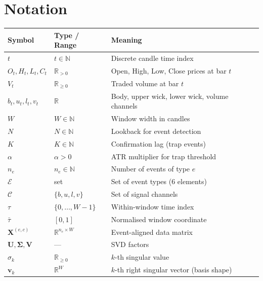 \documentclass[11pt,a4paper]{article}
\theoremstyle{definition}
\theoremstyle{plain}
\newcommand{\R}{\mathbb{R}}
\newcommand{\N}{\mathbb{N}}
\newcommand{\Xmat}{\mathbf{X}}
\newcommand{\Umat}{\mathbf{U}}
\newcommand{\Smat}{\boldsymbol{\Sigma}}
\newcommand{\Vmat}{\mathbf{V}}
\newcommand{\bvec}[1]{\mathbf{#1}}
\begin{document}
\section{Notation}
\label{sec:notation}

\begin{center}
\small
\begin{tabular}{lll}
\hline
\textbf{Symbol} & \textbf{Type / Range} & \textbf{Meaning} \\
\hline
$t$               & $t \in \N$                    & Discrete candle time index \\
$O_t, H_t, L_t, C_t$ & $\R_{>0}$              & Open, High, Low, Close prices at bar $t$ \\
$V_t$             & $\R_{\geq 0}$                 & Traded volume at bar $t$ \\
$b_t, u_t, l_t, v_t$ & $\R$                    & Body, upper wick, lower wick, volume channels \\
$W$               & $W \in \N$                    & Window width in candles \\
$N$               & $N \in \N$                    & Lookback for event detection \\
$K$               & $K \in \N$                    & Confirmation lag (trap events) \\
$\alpha$          & $\alpha > 0$                  & ATR multiplier for trap threshold \\
$n_e$             & $n_e \in \N$                  & Number of events of type $e$ \\
$\mathcal{E}$     & set                           & Set of event types (6 elements) \\
$\mathcal{C}$     & $\{b, u, l, v\}$              & Set of signal channels \\
$\tau$            & $\{0,\ldots,W{-}1\}$          & Within-window time index \\
$\bar{\tau}$      & $[0,1]$                       & Normalised window coordinate \\
$\Xmat^{(e,c)}$   & $\R^{n_e \times W}$           & Event-aligned data matrix \\
$\Umat, \Smat, \Vmat$ & ---                       & SVD factors \\
$\sigma_k$        & $\R_{\geq 0}$                 & $k$-th singular value \\
$\bvec{v}_k$      & $\R^W$                        & $k$-th right singular vector (basis shape) \\

\end{tabular}
\end{center}
\end{document}
